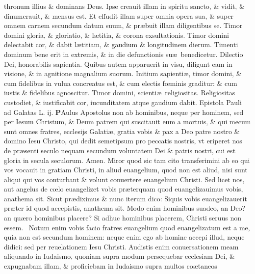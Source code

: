 \documentclass[a5paper,10pt]{book}
\def\leftmarginnote{%
	\lrmarginnote{\hskip -\marginparsep \hskip -6.5em}}
\def\rightmarginnote{%
	\lrmarginnote{\hskip\columnwidth \hskip -1em}}
\def\ae{æ}
\def\oe{œ}
\begin{document}
\begin{multicols*}{2}
thronum illius \& dominans Deus.
Ipse creauit illam in spiritu sancto, \& vidit, \& dinumerauit, \& mensus est. Et effudit illam super omnia opera sua, \& super omnem carnem secundum datum suum, \& pr\ae buit illam diligentibus se.
Timor domini gloria, \& gloriatio, \& l\ae titia, \& corona exsultationis. Timor domini delectabit cor, \& dabit l\ae titiam, \& gaudium \& longitudinem dierum.
Timenti dominum bene erit in extremis, \& in die defunctionis su\ae \ benedicetur. Dilectio Dei, honorabilis sapientia. Quibus autem apparuerit in visu, diligunt eam in visione, \& in agnitione magnalium suorum.
Initium sapienti\ae , timor domini, \& cum fidelibus in vulua concreatus est, \& cum electis f\oe minis graditur: \& cum iustis \& fidelibus agnoscitur.
Timor domini, scienti\ae \ religiositas. Religiositas custodiet, \& iustificabit cor, iucunditatem atque gaudium dabit.
\newline \color{red} Epistola Pauli ad Galatas \hfill L. ij. \color{black}
\vspace{-.25em}
\lettrine[lines=2]{\bfseries \color{red} P}{}Aulus\rightmarginnote{ca. 1.} Apostolus non ab hominibus, neque per hominem, sed per Iesum Christum, \& Deum patrem qui suscitauit eum a mortuis, \& qui mecum sunt omnes fratres, ecclesijs Galati\ae , gratia vobis \& pax a Deo patre nostro \& domino Iesu Christo, qui dedit semetipsum pro peccatis nostris, vt eriperet nos de pr\ae senti seculo nequam secundum voluntatem Dei \& patris nostri, cui est gloria in secula seculorum. Amen.
Miror quod sic tam cito transferimini ab eo qui vos vocauit in gratiam Christi, in aliud euangelium, quod non est aliud, nisi sunt aliqui qui vos conturbant \& volunt conuertere euangelium Christi.
Sed licet nos, aut angelus de c\oe lo euangelizet vobis pr\ae terquam quod euangelizauimus vobis, anathema sit. Sicut pr\ae diximus \& nunc iterum dico: Siquis vobis euangelizauerit pr\ae ter id quod accepistis, anathema sit.
Modo enim hominibus suadeo, an Deo? an qu\ae ro hominibus placere? Si adhuc hominibus placerem, Christi seruus non essem. \textdagger \ 
Notum\leftmarginnote{\begin{flushright}B\end{flushright}} enim vobis facio fratres euangelium quod euangelizatum est a me, quia non est secundum hominem: neque enim ego ab homine accepi illud, neque didici: sed per reuelationem Iesu Christi.
Audistis enim conuersationem meam aliquando in Iudaismo, quoniam supra modum persequebar ecclesiam Dei, \& expugnabam illam, \& proficiebam in Iudaismo supra multos co\ae taneos

\end{multicols*}
\end{document}
